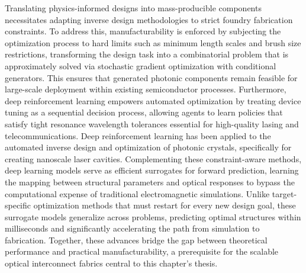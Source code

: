 Translating physics-informed designs into mass-producible components necessitates adapting inverse design methodologies to strict foundry fabrication constraints. To address this, manufacturability is enforced by subjecting the optimization process to hard limits such as minimum length scales and brush size restrictions, transforming the design task into a combinatorial problem that is approximately solved via stochastic gradient optimization with conditional generators. This ensures that generated photonic components remain feasible for large-scale deployment within existing semiconductor processes. Furthermore, deep reinforcement learning empowers automated optimization by treating device tuning as a sequential decision process, allowing agents to learn policies that satisfy tight resonance wavelength tolerances essential for high-quality lasing and telecommunications. Deep reinforcement learning has been applied to the automated inverse design and optimization of photonic crystals, specifically for creating nanoscale laser cavities. \citep{doi_10_1515_nanoph_2022_0692_4b166807} Complementing these constraint-aware methods, deep learning models serve as efficient surrogates for forward prediction, learning the mapping between structural parameters and optical responses to bypass the computational expense of traditional electromagnetic simulations. Unlike target-specific optimization methods that must restart for every new design goal, these surrogate models generalize across problems, predicting optimal structures within milliseconds and significantly accelerating the path from simulation to fabrication. Together, these advances bridge the gap between theoretical performance and practical manufacturability, a prerequisite for the scalable optical interconnect fabrics central to this chapter's thesis. \citep{doi_10_1021_acsphotonics_2c00313_0d7d39c3} \citep{doi_10_1515_nanoph_2022_0692_4b166807} \citep{doi_10_29026_oes_2022_210012_27973a69} \citep{doi_10_1109_jphot_2022_3182050_3cfb78ba}


